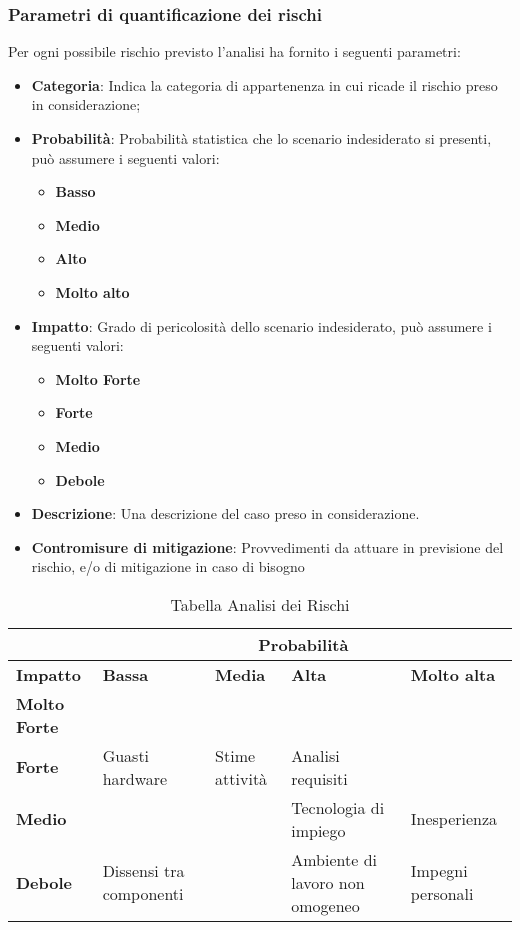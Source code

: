 \documentclass{scalatekids-article}
\begin{document}
\subsubsection{Parametri di quantificazione dei rischi}
Per ogni possibile rischio previsto l'analisi ha fornito i seguenti parametri:
\begin{itemize}
\item\textbf{Categoria}: Indica la categoria di appartenenza in cui ricade il
  rischio preso in considerazione;
\item\textbf{Probabilità}: Probabilità statistica che lo scenario indesiderato
  si presenti, può assumere i seguenti valori:
  \begin{itemize}
  \item\textbf{Basso}
  \item\textbf{Medio}
  \item\textbf{Alto}
  \item\textbf{Molto alto}
  \end{itemize}
\item\textbf{Impatto}: Grado di pericolosità dello scenario indesiderato, può
  assumere i seguenti valori:
  \begin{itemize}
  \item\textbf{Molto Forte}
  \item\textbf{Forte}
  \item\textbf{Medio}
  \item\textbf{Debole}
  \end{itemize}
\item\textbf{Descrizione}: Una descrizione del caso preso in considerazione.
\item\textbf{Contromisure di mitigazione}: Provvedimenti da attuare in
  previsione del rischio, e/o di mitigazione in caso di bisogno
\end{itemize}
\begin{table}[H]
  \centering
  \scriptsize
  \caption{Tabella Analisi dei Rischi}
  \begin{tabular}{|m{1cm}|m{3cm}|m{3cm}|m{3cm}|m{3cm}|}
    \hline
    & \multicolumn{4}{|c|}{\textbf{Probabilità}}\\
    \hline
    \bf Impatto & \bf Bassa & \bf Media & \bf Alta & \textbf{Molto alta} \\
    \hline
    \bf Molto Forte & \cellcolor{red!50} & \cellcolor{red!50} & \cellcolor{red!50} &\cellcolor{red!50} \\
    \hline
    \bf Forte & \cellcolor{yellow!50}Guasti hardware & \cellcolor{yellow!50}Stime attività & \cellcolor{red!50}Analisi requisiti &\cellcolor{red!50}\\[8pt]
    \hline
    \bf Medio & \cellcolor{green!50} & \cellcolor{yellow!50} &\cellcolor{yellow!50}Tecnologia di impiego &\cellcolor{red!50}Inesperienza \\[8pt]
    \hline
    \bf Debole & \cellcolor{green!50}Dissensi tra componenti & \cellcolor{green!50} &\cellcolor{yellow!50}Ambiente di lavoro non omogeneo &\cellcolor{yellow!50}Impegni personali \\
    \hline
  \end{tabular} \\
\end{table}
\end{document}

